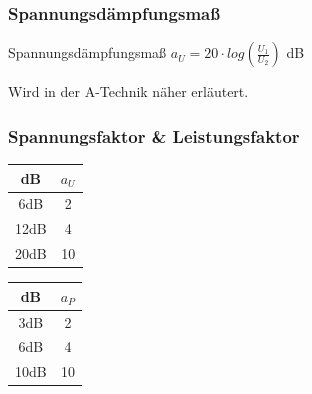 \begin{frame}
  \frametitle{Spannungs\-dämpfungs\-maß}
  \begin{block}{Spannungsdämpfungsmaß}
    \Huge{$a_{U} = 20 \cdot log(\frac{U_{1}}{U_{2}})$ dB}
  \end{block}
  \vspace{2cm}
  Wird in der A-Technik näher erläutert.
\end{frame}

\begin{frame}
  \frametitle{Spannungsfaktor \& Leistungsfaktor}
  \begin{center}
    \begin{Huge}
      \begin{minipage}{0.3\textwidth}
        \begin{tabular}{|c|c|}
          \hline
          \textbf{dB} & $a_{U}$ \\
          \hline \hline
          \alert{6dB}  & \alert{2}  \\ \hline
          12dB & 4  \\ \hline
          \alert{20dB} & \alert{10} \\ \hline
        \end{tabular}
      \end{minipage}
      \hspace{2cm}
      \begin{minipage}{0.3\textwidth}
        \begin{tabular}{|c|c|}
          \hline
          \textbf{dB} & $a_{P}$ \\
          \hline \hline
          \alert{3dB}  & \alert{2}  \\ \hline
          6dB  & 4  \\ \hline
          \alert{10dB} & \alert{10} \\ \hline
        \end{tabular}
      \end{minipage}
    \end{Huge}
  \end{center}
\end{frame}

